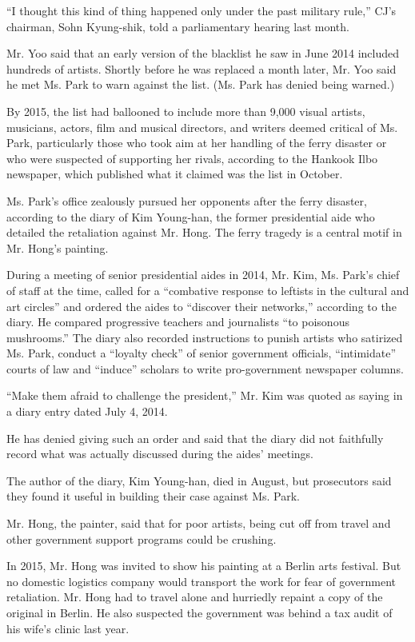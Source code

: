 ``I thought this kind of thing happened only under the past military
rule,'' CJ's chairman, Sohn Kyung-shik, told a parliamentary hearing
last month.

Mr. Yoo said that an early version of the blacklist he saw in June 2014
included hundreds of artists. Shortly before he was replaced a month
later, Mr. Yoo said he met Ms. Park to warn against the list. (Ms. Park
has denied being warned.)

By 2015, the list had ballooned to include more than 9,000 visual
artists, musicians, actors, film and musical directors, and writers
deemed critical of Ms. Park, particularly those who took aim at her
handling of the ferry disaster or who were suspected of supporting her
rivals, according to the Hankook Ilbo newspaper, which published what it
claimed was the list in October.

Ms. Park's office zealously pursued her opponents after the ferry
disaster, according to the diary of Kim Young-han, the former
presidential aide who detailed the retaliation against Mr. Hong. The
ferry tragedy is a central motif in Mr. Hong's painting.

During a meeting of senior presidential aides in 2014, Mr. Kim, Ms.
Park's chief of staff at the time, called for a ``combative response to
leftists in the cultural and art circles'' and ordered the aides to
``discover their networks,'' according to the diary. He compared
progressive teachers and journalists ``to poisonous mushrooms.'' The
diary also recorded instructions to punish artists who satirized Ms.
Park, conduct a ``loyalty check'' of senior government officials,
``intimidate'' courts of law and ``induce'' scholars to write
pro-government newspaper columns.

``Make them afraid to challenge the president,'' Mr. Kim was quoted as
saying in a diary entry dated July 4, 2014.

He has denied giving such an order and said that the diary did not
faithfully record what was actually discussed during the aides'
meetings.

The author of the diary, Kim Young-han, died in August, but prosecutors
said they found it useful in building their case against Ms. Park.

Mr. Hong, the painter, said that for poor artists, being cut off from
travel and other government support programs could be crushing.

In 2015, Mr. Hong was invited to show his painting at a Berlin arts
festival. But no domestic logistics company would transport the work for
fear of government retaliation. Mr. Hong had to travel alone and
hurriedly repaint a copy of the original in Berlin. He also suspected
the government was behind a tax audit of his wife's clinic last year.

